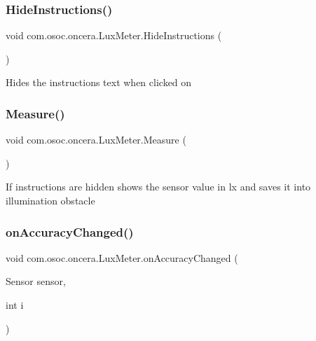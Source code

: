 \subsubsection{\texorpdfstring{HideInstructions()}{HideInstructions()}}
{\footnotesize\ttfamily void com.\+osoc.\+oncera.\+Lux\+Meter.\+Hide\+Instructions (\begin{DoxyParamCaption}{ }\end{DoxyParamCaption})}

Hides the instructions text when clicked on \mbox{\label{classcom_1_1osoc_1_1oncera_1_1_lux_meter_aa62bb970de63f2e2dc33ce51b81f4cd1}} 
\subsubsection{\texorpdfstring{Measure()}{Measure()}}
{\footnotesize\ttfamily void com.\+osoc.\+oncera.\+Lux\+Meter.\+Measure (\begin{DoxyParamCaption}{ }\end{DoxyParamCaption})}

If instructions\textquotesingle{} are hidden shows the sensor value in lx and saves it into illumination obstacle \mbox{\label{classcom_1_1osoc_1_1oncera_1_1_lux_meter_ae966bff7c1ad0c42e975596582103cf5}} 
\subsubsection{\texorpdfstring{onAccuracyChanged()}{onAccuracyChanged()}}
{\footnotesize\ttfamily void com.\+osoc.\+oncera.\+Lux\+Meter.\+on\+Accuracy\+Changed (\begin{DoxyParamCaption}\item[{Sensor}]{sensor,  }\item[{int}]{i }\end{DoxyParamCaption})}

\mbox{\label{classcom_1_1osoc_1_1oncera_1_1_lux_meter_a29325bd8ae0a741d85655bdc82119362}} 
